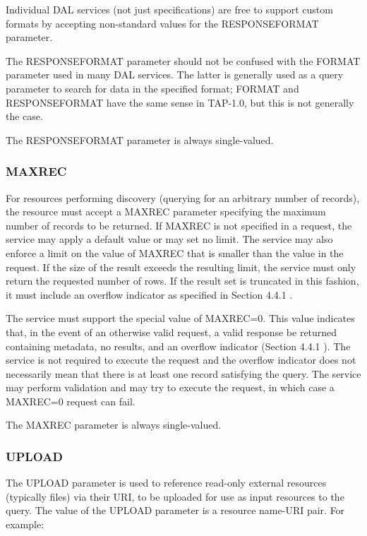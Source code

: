 \documentclass[11pt,letter]{ivoa}
\begin{document}
Individual DAL services (not just specifications) are free to support custom 
formats by accepting non-standard values for the RESPONSEFORMAT parameter.

The RESPONSEFORMAT parameter should not be confused with the FORMAT parameter 
used in many DAL services. The latter is generally used as a query parameter to 
search for data in the specified format; FORMAT and RESPONSEFORMAT have the same 
sense in TAP-1.0, but this is not generally the case.

The RESPONSEFORMAT parameter is always single-valued.

\subsubsection{MAXREC}
\label{sec:MAXREC}
For resources performing discovery (querying for an arbitrary number of 
records), the resource must accept a MAXREC parameter specifying the maximum 
number of records to be returned. If MAXREC is not specified in a request, the 
service may apply a default value or may set no limit. The service may also 
enforce a limit on the value of MAXREC that is smaller than the value in the 
request. If the size of the result exceeds the resulting limit, the service must 
only return the requested number of rows. If the result set is truncated in this 
fashion, it must include an overflow indicator as specified in Section 4.4.1 .

The service must support the special value of MAXREC=0. This value indicates 
that, in the event of an otherwise valid request, a valid response be returned 
containing metadata, no results, and an overflow indicator (Section 4.4.1 ). The 
service is not required to execute the request and the overflow indicator does 
not necessarily mean that there is at least one record satisfying the query. The 
service may perform validation and may try to execute the request, in which case 
a MAXREC=0 request can fail.

The MAXREC parameter is always single-valued.

\subsubsection{UPLOAD}
\label{sec:UPLOAD}
The UPLOAD parameter is used to reference read-only external resources 
(typically files) via their URI, to be uploaded for use as input resources to 
the query. The value of the UPLOAD parameter is a resource name-URI pair. For 
example:
\end{document}

